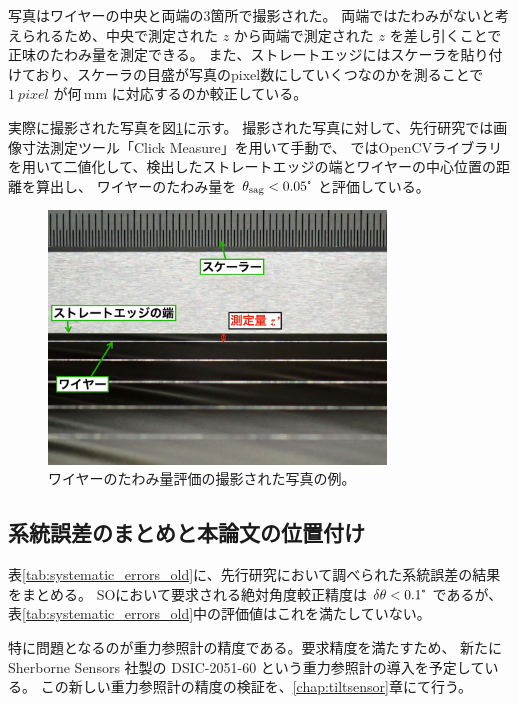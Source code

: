 \documentclass[../../main.tex]{subfiles}
\begin{document}
写真はワイヤーの中央と両端の3箇所で撮影された。
両端ではたわみがないと考えられるため、中央で測定された $z$ から両端で測定された $z$ を差し引くことで正味のたわみ量を測定できる。
また、ストレートエッジにはスケーラを貼り付けており、スケーラの目盛が写真のpixel数にしていくつなのかを測ることで
$\SI{1}{pixel}$ が何\,$\mathrm{mm}$ に対応するのか較正している。

実際に撮影された写真を図\ref{fig:wiresag_picture_old}に示す。
撮影された写真に対して、先行研究\cite{swg:murata}では画像寸法測定ツール「Click Measure」を用いて手動で、
\cite{swg:iijima}ではOpenCVライブラリを用いて二値化して、検出したストレートエッジの端とワイヤーの中心位置の距離を算出し、
ワイヤーのたわみ量を $\theta_{\mathrm{sag}} < 0.05\tcdegree$ と評価している。

\begin{figure}[H]
    \centering
    \includegraphics[width=0.8\textwidth]{wiregrid/wiresag_picture_old.pdf}
    \caption{ワイヤーのたわみ量評価の撮影された写真の例。}
    \label{fig:wiresag_picture_old}
\end{figure}
\subsection{系統誤差のまとめと本論文の位置付け}
表\ref{tab:systematic_errors_old}に、先行研究において調べられた系統誤差の結果をまとめる。
SOにおいて要求される絶対角度較正精度は $\delta\theta < 0.1\tcdegree$ であるが、
表\ref{tab:systematic_errors_old}中の評価値はこれを満たしていない。

特に問題となるのが重力参照計の精度である。要求精度を満たすため、
新たに Sherborne Sensors 社製の DSIC-2051-60 という重力参照計の導入を予定している。
この新しい重力参照計の精度の検証を、\ref{chap:tiltsensor}章にて行う。
\end{document}
